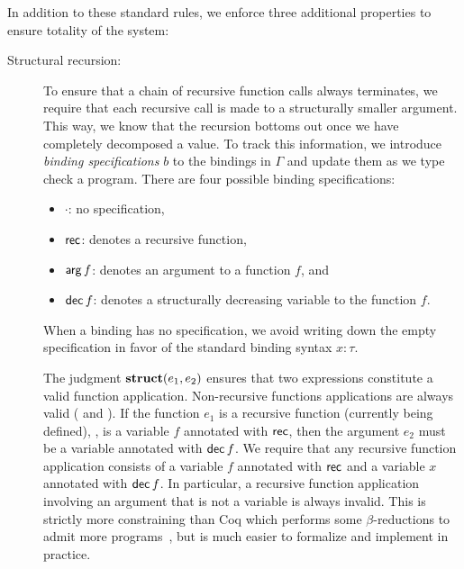 In addition to these standard rules, we enforce three additional properties to ensure totality of the system:
\begin{description}
  \item[Structural recursion:]
    To ensure that a chain of recursive function calls always terminates, we require that each recursive call is made to a structurally smaller argument.
    This way, we know that the recursion bottoms out once we have completely decomposed a value.
    To track this information, we introduce \emph{binding specifications} $b$ to the bindings in $Γ$ and update them as we type check a program.
    There are four possible binding specifications:
    \begin{itemize}
      \item $·$: no specification,
      \item $\mathsf{rec}$: denotes a recursive function,
      \item $\mathsf{arg}\,f$: denotes an argument to a function $f$, and
      \item $\mathsf{dec}\,f$: denotes a structurally decreasing variable to the function $f$.
    \end{itemize}
    When a binding has no specification, we avoid writing down the empty specification in favor of the standard binding syntax $x{:}τ$.

    The judgment $\mathbf{struct}(e_1, e_2)$ ensures that two expressions constitute a valid function application.
    Non-recursive functions applications are always valid ( and ).
    If the function $e_1$ is a recursive function (currently being defined), \ie, is a variable $f$ annotated with $\mathsf{rec}$, then the argument $e_2$ must be a variable annotated with $\mathsf{dec}\,f$.
    We require that any recursive function application consists of a variable $f$ annotated with $\mathsf{rec}$ and a variable $x$ annotated with $\mathsf{dec}\,f$.
    In particular, a recursive function application involving an argument that is not a variable is always invalid.
    This is strictly more constraining than Coq which performs some $β$-reductions to admit more programs~\citep{coq-2012}, but is much easier to formalize and implement in practice.


\end{description}
